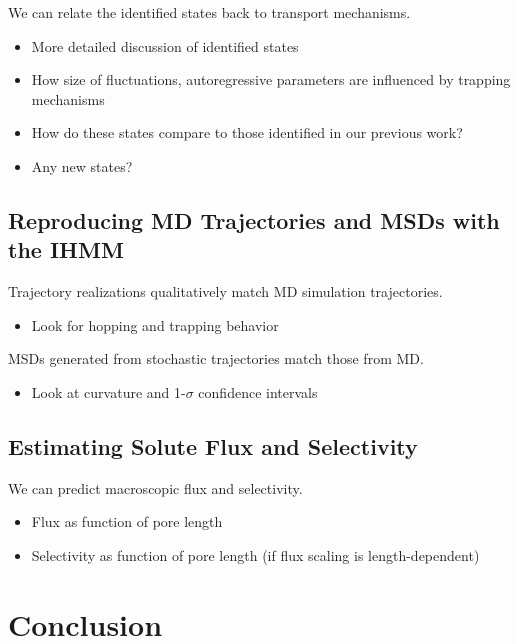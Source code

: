 \documentclass{article}
\begin{document}
  \noindent We can relate the identified states back to transport mechanisms.
  \begin{itemize}
  	\item More detailed discussion of identified states
  	\item How size of fluctuations, autoregressive parameters are influenced by trapping mechanisms
  	\item How do these states compare to those identified in our previous work?
  	\item Any new states?
  \end{itemize}
  
  \subsection{Reproducing MD Trajectories and MSDs with the IHMM}
  
  \noindent Trajectory realizations qualitatively match MD simulation trajectories.

  \begin{itemize}
    \item Look for hopping and trapping behavior
  \end{itemize}
  
  \noindent MSDs generated from stochastic trajectories match those from MD.
  \begin{itemize}
  	\item Look at curvature and 1-$\sigma$ confidence intervals
  \end{itemize}
  
  \subsection{Estimating Solute Flux and Selectivity}  
  
  \noindent We can predict macroscopic flux and selectivity.
  \begin{itemize}
  	\item Flux as function of pore length
  	\item Selectivity as function of pore length (if flux scaling is length-dependent)
  \end{itemize}
 
  \section{Conclusion}
  
\end{document}
